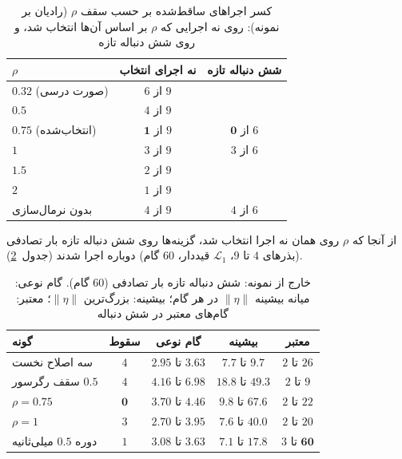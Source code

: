 \documentclass[10pt,twocolumn]{article}
\newcommand{\nd}{\lr{\textendash}}
\begin{document}
\begin{table}[H]
    \centering
    \caption{کسر اجراهای ساقط‌شده بر حسب سقف $\rho$ (رادیان بر نمونه): روی نه اجرایی
    که $\rho$ بر اساس آن‌ها انتخاب شد، و روی شش دنباله تازه}
    \label{tab:window}
    \small
    \begin{tabular}{lcc}
        \toprule
        $\rho$ & نه اجرای انتخاب & شش دنباله تازه \\
        \midrule
        $0.32$ (صورت درسی) & $6$ از $9$ & \nd{} \\
        $0.5$  & $4$ از $9$ & \nd{} \\
        $\mathbf{0.75}$ (انتخاب‌شده) & $\mathbf{1}$ از $9$ & $\mathbf{0}$ از $6$ \\
        $1$    & $3$ از $9$ & $3$ از $6$ \\
        $1.5$  & $2$ از $9$ & \nd{} \\
        $2$    & $1$ از $9$ & \nd{} \\
        بدون نرمال‌سازی & $4$ از $9$ & $4$ از $6$ \\
        \bottomrule
    \end{tabular}
\end{table}

از آنجا که $\rho$ روی همان نه اجرا انتخاب شد، گزینه‌ها روی شش دنباله تازه بار تصادفی
(بذرهای $4$ تا $9$، $\mathcal{L}_1$ قیددار، $60$ گام) دوباره اجرا شدند
(جدول~\ref{tab:oos}).

\begin{table}[H]
    \centering
    \caption{خارج از نمونه: شش دنباله تازه بار تصادفی ($60$ گام). گام نوعی: میانه
    بیشینه $\|\eta\|$ در هر گام؛ بیشینه: بزرگ‌ترین $\|\eta\|$؛ معتبر: گام‌های معتبر
    در شش دنباله}
    \label{tab:oos}
    \footnotesize
    \begin{tabular}{lcccc}
        \toprule
        گونه & سقوط & گام نوعی & بیشینه & معتبر \\
        \midrule
        سه اصلاح نخست & $4$ & $2.95$ تا $3.63$ & $7.7$ تا $9.7$ & $2$ تا $26$ \\
        سقف رگرسور $0.5$ & $4$ & $4.16$ تا $6.98$ & $18.8$ تا $49.3$ & $2$ تا $9$ \\
        $\rho=0.75$ & $\mathbf{0}$ & $3.70$ تا $4.46$ & $9.8$ تا $67.6$ & $2$ تا $22$ \\
        $\rho=1$ & $3$ & $2.70$ تا $3.95$ & $7.6$ تا $40.0$ & $2$ تا $20$ \\
        دوره $0.5$ میلی‌ثانیه & $1$ & $3.08$ تا $3.63$ & $7.1$ تا $17.8$ & $3$ تا $\mathbf{60}$ \\
        \bottomrule
    \end{tabular}
\end{table}
\end{document}
